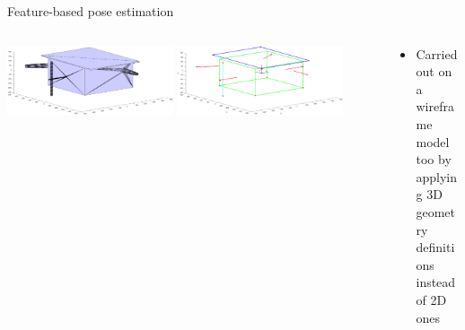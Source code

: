 \documentclass[10pt]{beamer}
\begin{document}
\begin{frame}{Feature-based pose estimation}
  \bigskip

  \begin{columns}[T,onlytextwidth]
    \begin{column}{0.6\textwidth}
      \vspace{0.38cm}
      \hspace{-0.3cm}
      \includegraphics[width=0.45\textwidth]{gfx/cadFull.eps}
      \hspace{0.1cm}
      \includegraphics[width=0.45\textwidth]{gfx/wireframeModel.eps}
    \end{column}
    \begin{column}{0.45\textwidth}
      \begin{itemize}[leftmargin=0.25cm,label=$\bullet$]
        \item Carried out on a wireframe\\ model too by applying 3D geometry definitions instead\\ of 2D ones
      \end{itemize}
    \end{column}
  \end{columns}

\end{frame}
\end{document}
